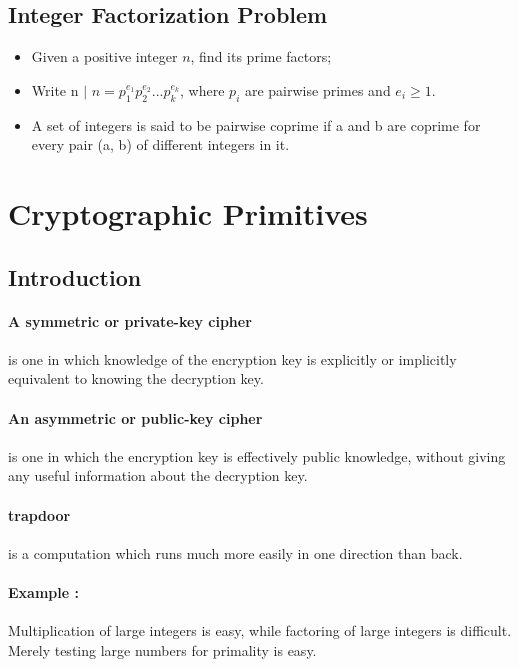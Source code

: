 \documentclass[12pt]{article}
\begin{document}
\subsection{Integer Factorization Problem}
\begin{itemize}
\item Given a positive integer $\textit{n}$, find its prime factors;
\item Write n $\mid$ $n = p_{1}^{e_{1}}p_{2}^{e_{2}}...p_{k}^{e_{k}}$, where $p_{i}$ are pairwise primes and $e_{i} \geq 1.$
\item  A set of integers is said to be pairwise coprime if a and b are coprime for every pair (a, b) of different integers in it.
\end{itemize}







%
%
\section{Cryptographic Primitives}
\subsection{Introduction}
\paragraph{A symmetric or private-key cipher} is one in which knowledge of the encryption key is explicitly or implicitly equivalent to knowing the decryption key.
\paragraph{An asymmetric or public-key cipher} is one in which the encryption key is effectively public knowledge, without giving any useful information about the decryption key.

\paragraph{trapdoor } is a computation which runs much more easily in one direction than back.

\paragraph{Example : }Multiplication of large integers is easy, while factoring of large integers is difficult.\\
Merely testing large numbers for primality is easy.
\end{document}
